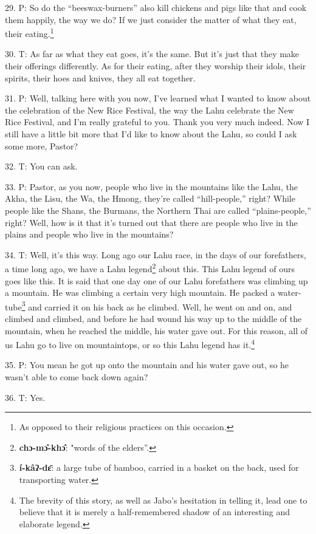 29. P: So do the ``beeswax-burners'' also kill chickens and pigs
like that and cook them happily, the way we do? If we just consider the matter
of what they eat, their eating.\footnote{As opposed to their religious practices on this occasion.}

30. T: As far as what they eat goes, it's the same. But it's just that they make
their offerings differently. As for their eating, after they worship their idols,
their spirits, their hoes and knives, they all eat together.

31. P: Well, talking here with you now, I've learned what I wanted to know about
the celebration of the New Rice Festival, the way the Lahu celebrate the New Rice
Festival, and I'm really grateful to you. Thank you very much indeed. Now I still
have a little bit more that I'd like to know about the Lahu, so could I ask some
more, Pastor?

32. T: You can ask.

33. P: Pastor, as you now, people who live in the mountains like the Lahu, the Akha,
the Lisu, the Wa, the Hmong, they're called ``hill-people,'' right?
While people like the Shans, the Burmans, the Northern Thai are called ``plains-people,''
right? Well, how is it that it's turned out that there are people who live in the
plains and people who live in the mountains?

34. T: Well, it's this way. Long ago our Lahu race, in the days of our forefathers,
a time long ago, we have a Lahu legend\footnote{\textbf{chɔ-mɔ̂-khɔ̂}: "words of the elders''.} about this. This Lahu legend of ours
goes like this. It is said that one day one of our Lahu forefathers was climbing
up a mountain. He was climbing a certain very high mountain. He packed a water-tube\footnote{\textbf{í-kâʔ-dɛ̄}: a large tube of bamboo, carried in a basket on the back, used for transporting water.}
and carried it on his back as he climbed. Well, he went on and on, and climbed
and climbed, and before he had wound his way up to the middle of the mountain,
when he reached the middle, his water gave out. For this reason, all of us Lahu
go to live on mountaintops, or so this Lahu legend has it.\footnote{The brevity of this story, as well as Jabo's hesitation in telling it, lead one to believe that it is merely a half-remembered shadow of an interesting and elaborate legend.}

35. P: You mean he got up onto the mountain and his water gave out, so he wasn't
able to come back down again?

36. T: Yes.

